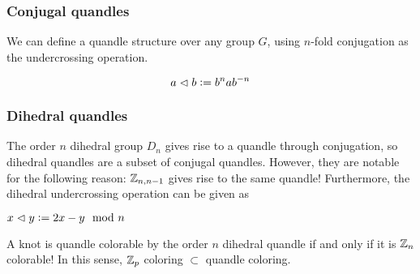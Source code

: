 \documentclass[paper.tex]{subfiles}
\begin{document}
\subsubsection{Conjugal quandles}
\label{sec:conjugal}

We can define a quandle structure over any group $G$, using $n$-fold conjugation as the undercrossing operation.

\begin{equation}
  a \vartriangleleft b \vcentcolon= b^n a b^{-n}
\end{equation}

\subsubsection{Dihedral quandles}
\label{sec:dihedral}

The order $n$ dihedral group $D_n$ gives rise to a quandle through conjugation, so dihedral quandles are a subset of conjugal quandles. However, they are notable for the following reason:
$\mathbb{Z}_{n, n - 1}$ gives rise to the same quandle! Furthermore, the dihedral undercrossing operation can be given as

$x\vartriangleleft y \vcentcolon= 2x - y \mod n$

A knot is quandle colorable by the order $n$ dihedral quandle if and only if it is $\mathbb{Z}_n$ colorable! In this sense, $\mathbb{Z}_p$ coloring $\subset$ quandle coloring.
\end{document}
